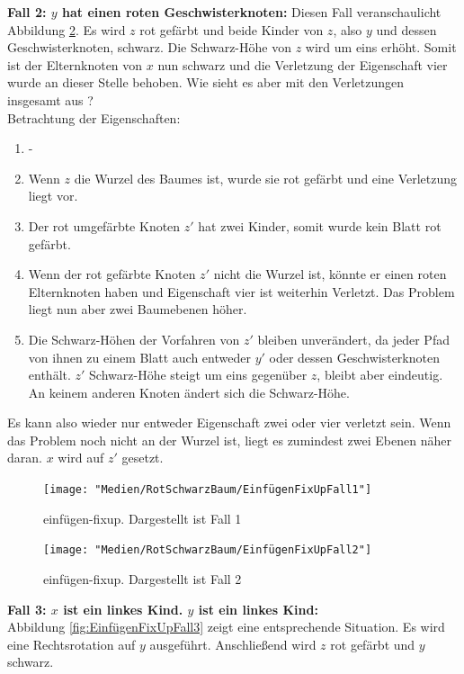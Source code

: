 \documentclass[a4paper,12pt]{article}
\begin{document}
\noindent\textbf{Fall 2: $y$ hat einen roten Geschwisterknoten: }
\noindent Diesen Fall veranschaulicht Abbildung \ref{fig:EinfügenFixUpFall2}. Es wird $z$ rot gefärbt und beide Kinder von $z$, also $y$ und dessen Geschwisterknoten, schwarz. Die Schwarz-Höhe von $z$ wird um eins erhöht. Somit ist der Elternknoten von $x$ nun schwarz und die Verletzung der Eigenschaft vier wurde an dieser Stelle behoben. Wie sieht es aber mit den Verletzungen insgesamt aus ? \\

Betrachtung der Eigenschaften:

\begin{enumerate}
	\item -
	\item Wenn $z$ die Wurzel des Baumes ist, wurde sie rot gefärbt und eine Verletzung liegt vor.
	\item Der rot umgefärbte Knoten $z'$ hat zwei Kinder, somit wurde kein Blatt rot gefärbt.
	\item  Wenn der rot gefärbte Knoten $z'$ nicht die Wurzel ist, könnte er einen roten Elternknoten haben und Eigenschaft vier ist weiterhin Verletzt. Das Problem liegt nun aber zwei Baumebenen höher.
	\item  Die Schwarz-Höhen der Vorfahren von $z'$ bleiben unverändert, da jeder Pfad von ihnen zu einem Blatt auch entweder $y'$ oder dessen Geschwisterknoten enthält. $z'$ Schwarz-Höhe steigt um eins gegenüber $z$, bleibt aber eindeutig. An keinem anderen Knoten ändert sich die Schwarz-Höhe. 

\end{enumerate} 
Es kann also wieder nur entweder Eigenschaft zwei oder vier verletzt sein. Wenn das Problem noch nicht an der Wurzel ist, liegt es zumindest zwei Ebenen näher daran. $x$ wird auf $z'$ gesetzt. 
\begin{figure}[H]
	\centering
	\texttt{[image: "Medien/RotSchwarzBaum/EinfügenFixUpFall1"]}
	\caption{einfügen-fixup. Dargestellt ist Fall 1  }
	\label{fig:EinfügenFixUpFall1}
\end{figure}
\begin{figure}[h]
	\centering
	\texttt{[image: "Medien/RotSchwarzBaum/EinfügenFixUpFall2"]}
	\caption{einfügen-fixup. Dargestellt ist Fall 2  }
	\label{fig:EinfügenFixUpFall2}
\end{figure}

\noindent\textbf{Fall 3: $x$ ist ein linkes Kind. $y$ ist ein linkes Kind: }\\
\noindent Abbildung \ref{fig:EinfügenFixUpFall3} zeigt eine entsprechende Situation. Es wird eine Rechtsrotation auf $y$ ausgeführt. Anschließend wird $z$ rot gefärbt und $y$ schwarz. \\
\end{document}
